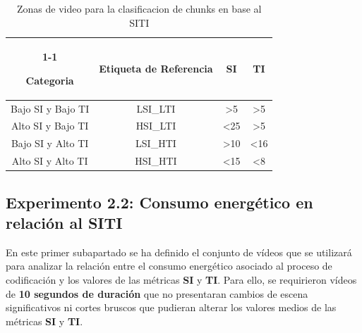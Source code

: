 \begin{table}[h]

     \centering

     \begin{tabular}{|c|ccc}

     \cline{1-1}

     \rowcolor[HTML]{9B9B9B} 

     \textbf{Categoria} & \textbf{Etiqueta de Referencia} & \textbf{SI} & \textbf{TI}                         \\ \hline

     Bajo SI y Bajo TI  & \multicolumn{1}{c|}{LSI\_LTI}   & \multicolumn{1}{c|}{\textgreater 5}  & \multicolumn{1}{c|}{\textgreater 5} \\ \hline

     Alto SI y Bajo TI  & \multicolumn{1}{c|}{HSI\_LTI}   & \multicolumn{1}{c|}{\textless 25}    & \multicolumn{1}{c|}{\textgreater 5} \\ \hline

     Bajo SI y Alto TI  & \multicolumn{1}{c|}{LSI\_HTI}   & \multicolumn{1}{c|}{\textgreater 10} & \multicolumn{1}{c|}{\textless 16}   \\ \hline

     Alto SI y Alto TI  & \multicolumn{1}{c|}{HSI\_HTI}   & \multicolumn{1}{c|}{\textless 15}    & \multicolumn{1}{c|}{\textless 8}    \\ \hline

     \end{tabular}
      \caption{Zonas de video para la clasificacion de chunks en base al SITI}
      \label{tab:siti-zones-definition}

\end{table}

\subsection{Experimento 2.2: Consumo energético en relación al SITI}\label{section:exp2.2-sitixconsumo}

En este primer subapartado se ha definido el conjunto de vídeos que se utilizará para analizar la relación entre el consumo energético asociado al proceso de codificación y los valores de las métricas \textbf{SI} y \textbf{TI}. Para ello, se requirieron vídeos de \textbf{10 segundos de duración} que no presentaran cambios de escena significativos ni cortes bruscos que pudieran alterar los valores medios de las métricas \textbf{SI} y \textbf{TI}. 

